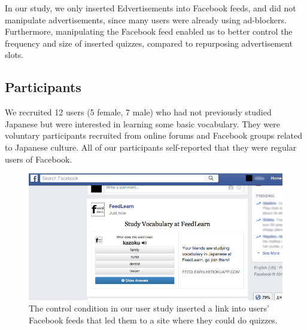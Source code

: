 \documentclass{sigchi}
\begin{document}

In our study, we only inserted Edvertisements into Facebook feeds, and did not manipulate advertisements, since many users were already using ad-blockers. Furthermore, manipulating the Facebook feed enabled us to better control the frequency and size of inserted quizzes, compared to repurposing advertisement slots. %


\subsection{Participants}

We recruited 12 users (5 female, 7 male) who had not previously studied Japanese but were interested in learning some basic vocabulary. They were voluntary participants recruited from online forums and Facebook groups related to Japanese culture. All of our participants self-reported that they were regular users of Facebook. %



\begin{figure}
\centering
\includegraphics[width=1.0\columnwidth]{feedlearn-link-screenshot}
\caption{The control condition in our user study inserted a link into users' Facebook feeds that led them to a site where they could do quizzes.}
\label{fig:control}
\end{figure}
\end{document}
